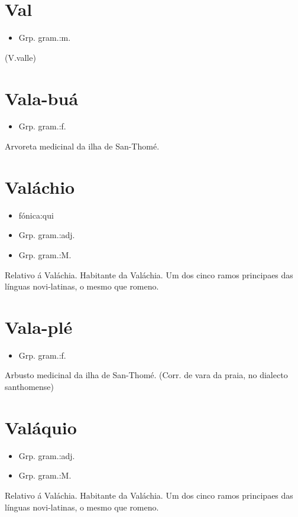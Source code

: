 \documentclass{article}
\begin{document}
\section{Val}
\begin{itemize}
\item {Grp. gram.:m.}
\end{itemize}
(V.valle)
\section{Vala-buá}
\begin{itemize}
\item {Grp. gram.:f.}
\end{itemize}
Arvoreta medicinal da ilha de San-Thomé.
\section{Valáchio}
\begin{itemize}
\item {fónica:qui}
\end{itemize}
\begin{itemize}
\item {Grp. gram.:adj.}
\end{itemize}
\begin{itemize}
\item {Grp. gram.:M.}
\end{itemize}
Relativo á Valáchia.
Habitante da Valáchia.
Um dos cinco ramos principaes das línguas novi-latinas, o mesmo que \textunderscore romeno\textunderscore .
\section{Vala-plé}
\begin{itemize}
\item {Grp. gram.:f.}
\end{itemize}
Arbusto medicinal da ilha de San-Thomé.
(Corr. de \textunderscore vara da praia\textunderscore , no dialecto santhomense)
\section{Valáquio}
\begin{itemize}
\item {Grp. gram.:adj.}
\end{itemize}
\begin{itemize}
\item {Grp. gram.:M.}
\end{itemize}
Relativo á Valáchia.
Habitante da Valáchia.
Um dos cinco ramos principaes das línguas novi-latinas, o mesmo que \textunderscore romeno\textunderscore .
\end{document}
